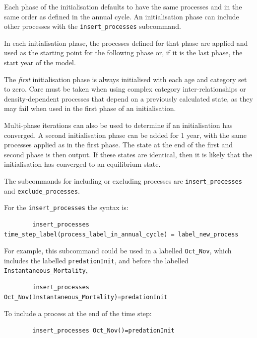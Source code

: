 Each phase of the initialisation defaults to have the same processes and in the same order as defined in the annual cycle. An initialisation phase can include other processes with the \texttt{insert\_processes} subcommand.

In each initialisation phase, the processes defined for that phase are applied and used as the starting point for the following phase or, if it is the last phase, the start year of the model.

The \emph{first} initialisation phase is always initialised with each age and category set to zero. Care must be taken when using complex category inter-relationships or density-dependent processes that depend on a previously calculated state, as they may fail when used in the first phase of an initialisation.

Multi-phase iterations can also be used to determine if an initialisation has converged. A second initialisation phase can be added for 1 year, with the same processes applied as in the first phase. The state at the end of the first and second phase is then output. If these states are identical, then it is likely that the initialisation has converged to an equilibrium state.

The subcommands for including or excluding processes are \texttt{insert\_processes} and \texttt{exclude\_processes}.

For the \texttt{insert\_processes} the syntax is:

{\small{\begin{verbatim}
		insert_processes time_step_label(process_label_in_annual_cycle) = label_new_process
\end{verbatim}}}

For example, this subcommand could be used in a  labelled \texttt{Oct\_Nov}, which includes the  labelled \texttt{predationInit}, and before the  labelled \texttt{Instantaneous\_Mortality},

{\small{\begin{verbatim}
		insert_processes Oct_Nov(Instantaneous_Mortality)=predationInit
\end{verbatim}}}

To include a process at the end of the time step:

{\small{\begin{verbatim}
		insert_processes Oct_Nov()=predationInit
		\end{verbatim}}}

